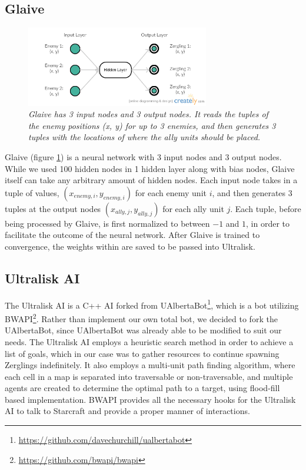 \documentclass[twocolumn]{article}
\begin{document}
\subsection{Glaive}
\begin{figure}
	\begin{center}
		\includegraphics[width=8cm]{../plots/nnLayout.png}
	\end{center}
	\caption{\textit{Glaive has 3 input nodes and 3 output nodes. It reads the tuples of the enemy positions (x, y) for up to 3 enemies, and then generates 3 tuples with the locations of where the ally units should be placed. }}
	\label{fig:glaive}
\end{figure}
Glaive (figure \ref{fig:glaive}) is a neural network with 3 input nodes and 3 output nodes. While we used 100 hidden nodes in 1 hidden layer along with bias nodes, Glaive itself can take any arbitrary amount of hidden nodes. Each input node takes in a tuple of values, $(x_{enemy, i}, y_{enemy, i})$ for each enemy unit $i$, and then generates 3 tuples at the output nodes $(x_{ally, j}, y_{ally, j})$ for each ally unit $j$. Each tuple, before being processed by Glaive, is first normalized to between $-1$ and $1$, in order to facilitate the outcome of the neural network. After Glaive is trained to convergence, the weights within are saved to be passed into Ultralisk. 

\subsection{Ultralisk AI}
The Ultralisk AI is a C++ AI forked from UAlbertaBot\footnote{\tiny{\url{https://github.com/davechurchill/ualbertabot}}}, which is a bot utilizing BWAPI\footnote{\tiny{\url{https://github.com/bwapi/bwapi}}}. Rather than implement our own total bot, we decided to fork the UAlbertaBot, since UAlbertaBot was already able to be modified to suit our needs. The Ultralisk AI employs a heuristic search method in order to achieve a list of goals, which in our case was to gather resources to continue spawning Zerglings indefinitely. It also employs a multi-unit path finding algorithm, where each cell in a map is separated into traversable or non-traversable, and multiple agents are created to determine the optimal path to a target, using flood-fill based implementation. BWAPI provides all the necessary hooks for the Ultralisk AI to talk to Starcraft and provide a proper manner of interactions. 
\end{document}
